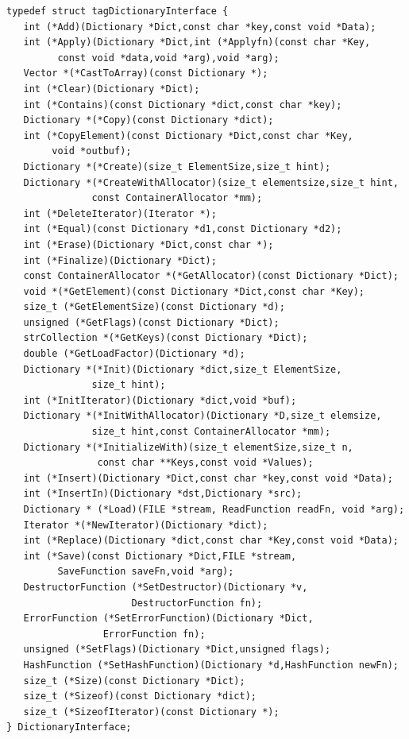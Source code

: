 \begin{verbatim}
typedef struct tagDictionaryInterface {
   int (*Add)(Dictionary *Dict,const char *key,const void *Data);
   int (*Apply)(Dictionary *Dict,int (*Applyfn)(const char *Key,
         const void *data,void *arg),void *arg);
   Vector *(*CastToArray)(const Dictionary *);
   int (*Clear)(Dictionary *Dict);
   int (*Contains)(const Dictionary *dict,const char *key);
   Dictionary *(*Copy)(const Dictionary *dict);
   int (*CopyElement)(const Dictionary *Dict,const char *Key,
        void *outbuf);
   Dictionary *(*Create)(size_t ElementSize,size_t hint);
   Dictionary *(*CreateWithAllocator)(size_t elementsize,size_t hint,
               const ContainerAllocator *mm);
   int (*DeleteIterator)(Iterator *);
   int (*Equal)(const Dictionary *d1,const Dictionary *d2);
   int (*Erase)(Dictionary *Dict,const char *);
   int (*Finalize)(Dictionary *Dict);
   const ContainerAllocator *(*GetAllocator)(const Dictionary *Dict);
   void *(*GetElement)(const Dictionary *Dict,const char *Key);
   size_t (*GetElementSize)(const Dictionary *d);
   unsigned (*GetFlags)(const Dictionary *Dict);
   strCollection *(*GetKeys)(const Dictionary *Dict);
   double (*GetLoadFactor)(Dictionary *d);
   Dictionary *(*Init)(Dictionary *dict,size_t ElementSize,
               size_t hint);
   int (*InitIterator)(Dictionary *dict,void *buf);
   Dictionary *(*InitWithAllocator)(Dictionary *D,size_t elemsize,
               size_t hint,const ContainerAllocator *mm);
   Dictionary *(*InitializeWith)(size_t elementSize,size_t n,
                const char **Keys,const void *Values);
   int (*Insert)(Dictionary *Dict,const char *key,const void *Data);
   int (*InsertIn)(Dictionary *dst,Dictionary *src);
   Dictionary * (*Load)(FILE *stream, ReadFunction readFn, void *arg);
   Iterator *(*NewIterator)(Dictionary *dict);
   int (*Replace)(Dictionary *dict,const char *Key,const void *Data);
   int (*Save)(const Dictionary *Dict,FILE *stream,
         SaveFunction saveFn,void *arg);
   DestructorFunction (*SetDestructor)(Dictionary *v,
                      DestructorFunction fn);
   ErrorFunction (*SetErrorFunction)(Dictionary *Dict,
                 ErrorFunction fn);
   unsigned (*SetFlags)(Dictionary *Dict,unsigned flags);
   HashFunction (*SetHashFunction)(Dictionary *d,HashFunction newFn);
   size_t (*Size)(const Dictionary *Dict);
   size_t (*Sizeof)(const Dictionary *dict);
   size_t (*SizeofIterator)(const Dictionary *);
} DictionaryInterface;
\end{verbatim}

